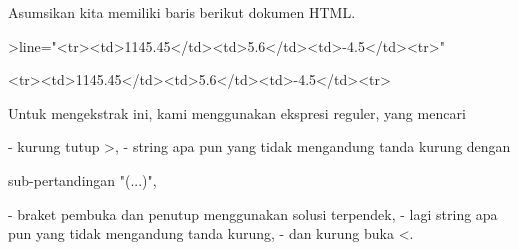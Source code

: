 \documentclass{article}
\begin{document}
\begin{eulernotebook}
\begin{eulercomment}
\begin{eulercomment}
\begin{eulercomment}
Asumsikan kita memiliki baris berikut dokumen HTML.
\end{eulercomment}
\begin{eulerprompt}
>line="<tr><td>1145.45</td><td>5.6</td><td>-4.5</td><tr>"
\end{eulerprompt}
\begin{euleroutput}
  <tr><td>1145.45</td><td>5.6</td><td>-4.5</td><tr>
\end{euleroutput}
\begin{eulercomment}
Untuk mengekstrak ini, kami menggunakan ekspresi reguler, yang mencari

\end{eulercomment}
\begin{eulerttcomment}
  - kurung tutup >,
  - string apa pun yang tidak mengandung tanda kurung dengan
\end{eulerttcomment}
\begin{eulercomment}
sub-pertandingan "(...)",\\
\end{eulercomment}
\begin{eulerttcomment}
  - braket pembuka dan penutup menggunakan solusi terpendek,
  - lagi string apa pun yang tidak mengandung tanda kurung,
  - dan kurung buka <.
\end{eulerttcomment}
\begin{eulercomment}


\end{eulercomment}
\end{eulercomment}
\end{eulercomment}
\end{eulernotebook}
\end{document}
